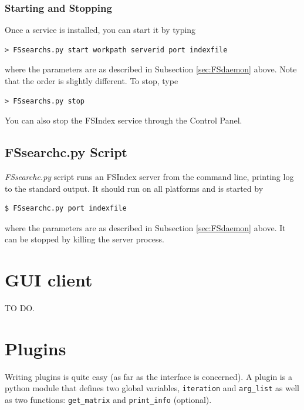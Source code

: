 \documentclass[11pt]{article}
\begin{document}
\subsubsection{Starting and Stopping}

Once a service is installed, you can start it by typing 
\begin{verbatim}
> FSsearchs.py start workpath serverid port indexfile
\end{verbatim}
where the parameters are as described in Subsection \ref{sec:FSdaemon} above. Note that the order is slightly different. To stop, type
\begin{verbatim}
> FSsearchs.py stop
\end{verbatim}
You can also stop the FSIndex service through the Control Panel.

\subsection{FSsearchc.py Script}\label{sec:FSscript}

\textit{FSsearchc.py} script runs an FSIndex server from the command line, printing log to the standard output. It should run on all platforms and is started by 
\begin{verbatim}
$ FSsearchc.py port indexfile
\end{verbatim}
where the parameters are as described in Subsection \ref{sec:FSdaemon} above. It can be stopped by killing the server process.

\section{GUI client}

TO DO.

\section{Plugins}

Writing plugins is quite easy (as far as the interface is concerned). A plugin is a python module that defines two global variables, \texttt{iteration} and \texttt{arg\_list} as well as two functions: \texttt{get\_matrix} and \texttt{print\_info} (optional).
\end{document}
